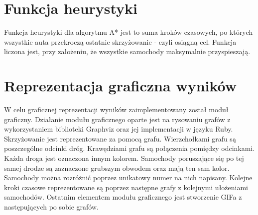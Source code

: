\section{Funkcja heurystyki}

Funkcja heurystyki dla algorytmu A* jest to suma kroków czasowych, po których wszystkie auta przekroczą ostatnie skrzyżowanie - czyli osiągną cel. Funkcja liczona jest, przy założeniu, że wszystkie samochody maksymalnie przyspieszają.

\section{Reprezentacja graficzna wyników}

W celu graficznej reprezentacji wyników zaimplementowany został moduł graficzny.
\newline
\newline
Działanie modułu graficznego oparte jest na rysowaniu grafów z wykorzystaniem biblioteki Graphviz oraz jej implementacji w języku Ruby.
\newline
\newline
Skrzyżowanie jest reprezentowane za pomocą grafu. Wierzchołkami grafu są poszczególne odcinki dróg. Krawędziami grafu są połączenia pomiędzy odcinkami.
\newline
\newline
Każda droga jest oznaczona innym kolorem.
\newline
\newline
Samochody poruszające się po tej samej drodze są zaznaczone grubszym obwodem oraz mają ten sam kolor. Samochody można rozróżnić poprzez unikatowy numer na nich napisany.
\newline
\newline
Kolejne kroki czasowe reprezentowane są poprzez następne grafy z kolejnymi ułożeniami samochodów.
\newline
\newline
Ostatnim elementem modułu graficznego jest stworzenie GIFa z następujących po sobie grafów.
\newline
\newline
\newline

